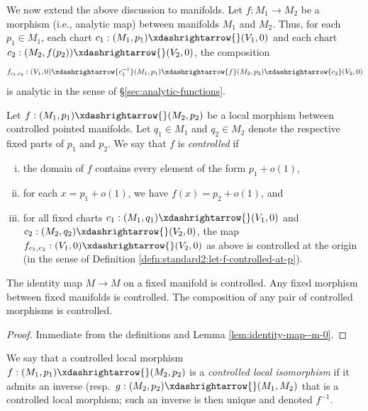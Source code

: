 We now extend the above discussion to manifolds.  Let $f : M_1 \rightarrow M_2$ be a morphism (i.e., analytic map) between manifolds $M_1$ and $M_2$.  Thus, for each $p_1 \in M_1$, each chart $c_1 : (M_1, p_1) \xdashrightarrow{} (V_1, 0)$ and each chart $c_2 : (M_2, f(p_2)) \xdashrightarrow{} (V_2,0)$, the composition
\begin{equation*}
  f_{c_1,c_2} : (V_1,0) \xdashrightarrow{c_1^{-1}} (M_1, p_1) \xdashrightarrow{f} (M_2, p_2) \xdashrightarrow{c_2} (V_2,0)
\end{equation*}
is analytic in the sense of \S\ref{sec:analytic-functions}.


\begin{definition}\label{defn:standard2:f-controlled-M1-M2}
  Let $f : (M_1,p_1) \xdashrightarrow{} (M_2,p_2)$ be a local morphism between controlled pointed manifolds.  Let $q_1 \in M_1$ and $q_2 \in M_2$ denote the respective fixed parts of $p_1$ and $p_2$.  We say that $f$ is \emph{controlled} if
  \begin{enumerate}[(i)]
  \item the domain of $f$ contains every element of the form $p_1 + o(1)$,
  \item for each $x = p_1 + o(1)$, we have $f(x) = p_2 + o(1)$, and
  \item for all fixed charts $c_1 : (M_1,q_1) \xdashrightarrow{} (V_1,0)$ and $c_2 : (M_2, q_2) \xdashrightarrow{} (V_2,0)$, the map $f_{c_1,c_2} : (V_1,0) \xdashrightarrow{} (V_2,0)$ as above is controlled at the origin (in the sense of Definition \ref{defn:standard2:let-f-controlled-at-p}).
  \end{enumerate}
\end{definition}

\begin{lemma}\label{lem:identity-map-m}
  The identity map $M \rightarrow M$ on a fixed manifold is controlled.  Any fixed morphism between fixed manifolds is controlled.  The composition of any pair of controlled morphisms is controlled.
\end{lemma}
\begin{proof}
  Immediate from the definitions and Lemma \ref{lem:identity-map--m-0}.
\end{proof}

\begin{definition}
  We say that a controlled local morphism $f : (M_1, p_1) \xdashrightarrow{} (M_2, p_2)$ is a \emph{controlled local isomorphism} if it admits an inverse (resp.\ $g : (M_2, p_2) \xdashrightarrow{} (M_1, M_2)$ that is a controlled local morphism; such an inverse is then unique and denoted $f^{-1}$.
\end{definition}

